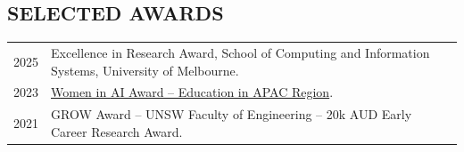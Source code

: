 
\subsection{SELECTED AWARDS}
\vspace{2pt}

\noindent
\begin{tabularx}{\textwidth}{@{}lX@{}}
2025 & Excellence in Research Award, School of Computing and Information Systems, University of Melbourne. \\[2pt]
2023 & \href{https://www.womeninai.co/waiawards2023apac}{Women in AI Award -- Education in APAC Region}. \\[2pt]
2021 & GROW Award -- UNSW Faculty of Engineering -- 20k AUD Early Career Research Award. \\[2pt]
\end{tabularx}

